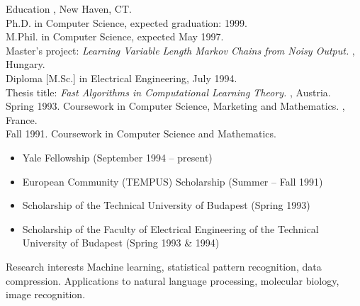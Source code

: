 \documentclass{resume}
\author{Mikl\'os Cs\H{u}r\"os}
\def\tub{Technical University of Budapest}
\def\facty{Faculty of Electrical Engineering}
\begin{document}
\maketitle


\begin{category}{Education}
, New Haven, CT.\\
Ph.D. in Computer Science, expected graduation: 1999.\\
M.Phil. in Computer Science, expected May 1997.\\
Master's project: {\em Learning Variable Length Markov Chains from Noisy Output.}
\citem{\tub}, Hungary. \\
Diploma [M.Sc.] in Electrical Engineering, July 1994.\\
Thesis title: {\em Fast Algorithms in Computational Learning Theory.}
, Austria.\\
Spring 1993. Coursework in Computer Science, Marketing and Mathematics.
,
France.\\
Fall 1991. Coursework in Computer Science and Mathematics.
\begin{itemize}
\item Yale Fellowship (September 1994 -- present)
\item European Community (TEMPUS) Scholarship (Summer -- Fall 1991)
\item Scholarship of the {\tub} (Spring 1993)
\item Scholarship of the {\facty} of the {\tub} (Spring 1993 \& 1994)
\end{itemize}
\end{category}


\begin{category}{Research interests}
\citemnobullet Machine learning, statistical pattern recognition, 
data compression. 
Applications to natural language processing, molecular biology, image recognition.
\end{category}
\end{document}
